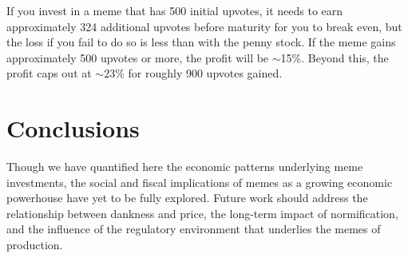 \documentclass[a4paper, 12pt]{article}
\begin{document}
If you invest in a meme that has 500 initial upvotes, it needs to earn approximately 324
additional upvotes before maturity for you to break even, but the loss if you
fail to do so is less than with the penny stock. If the meme gains approximately
500 upvotes or more, the profit will be \(\sim\)15\%. Beyond this, the profit caps out at \(\sim\)23\%
for roughly 900 upvotes gained.

\section*{Conclusions}
\label{sec:orge58a26f}

Though we have quantified here the economic patterns underlying meme investments, the
social and fiscal implications of memes as a growing economic powerhouse have
yet to be fully explored. Future work should address the relationship between
dankness and price, the long-term impact of normification, and the influence of
the regulatory environment that underlies the memes of production.



\end{document}
